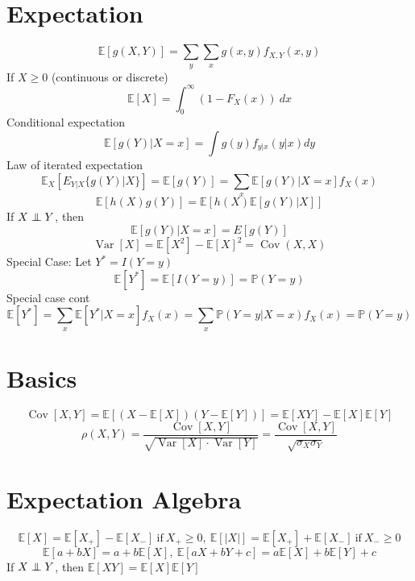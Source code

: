 \documentclass[twocolumn]{amsart}
\newcommand{\E}{\mathbb{E}}
\renewcommand{\P}{\mathbb{P}}
\newcommand{\Cov}{\operatorname{Cov}}
\newcommand{\Var}{\operatorname{Var}}
\newcommand\independent{\protect\mathpalette{\protect\independenT}{\perp}}
\def\independenT#1#2{\mathrel{\rlap{$#1#2$}\mkern3mu{#1#2}}}
\begin{document}
\pagestyle{empty}
\thispagestyle{empty}

\section*{Expectation}
\begin{equation*}
  \E[g(X,Y)] = \sum_{y}\sum_{x}g(x,y)f_{X,Y}(x,y)
\end{equation*}
If $X\geq 0$ (continuous or discrete)
\begin{equation*}
  \E[X] = \int_{0}^{\infty}(1-F_{X}(x))~dx
\end{equation*}
Conditional expectation
\begin{equation*}
  \E[g(Y)|X=x] = \int g(y) f_{y|x}(y|x)dy
\end{equation*}
Law of iterated expectation
\begin{equation*}
  \E_{X}[E_{Y|X}\{g(Y)|X\}] = \E[g(Y)] = \sum_{x}\E[g(Y)|X=x]f_{X}(x)
\end{equation*}
\begin{equation*}
  \E[h(X)g(Y)] = \E[h(X)\E[g(Y)|X]]
\end{equation*}
If \(X \independent Y\), then
\begin{equation*}
  \E[g(Y) | X=x] = E[g(Y)]
\end{equation*}
\begin{equation*}
  \Var[X] = \E[X^{2}] - \E[X]^{2} = \Cov(X,X)
\end{equation*}
Special Case: Let $Y^{*} = I(Y=y)$
\begin{equation*}
  \E[Y^{*}] = \E[I(Y=y)] = \P(Y=y)
\end{equation*}
Special case cont
\begin{equation*}
  \E[Y^{*}] = \sum_{x}\E[Y^{*}|X=x]f_{X}(x) = \sum_{x}\P(Y=y|X=x)f_{X}(x) =
  \P(Y=y)
\end{equation*}

\section*{Basics}
\begin{equation*}
  \Cov[X,Y] = \E[(X-\E[X])(Y-\E[Y])] = \E[XY] - \E[X]\E[Y]
\end{equation*}
\begin{equation*}
  \rho(X,Y) = \frac{\Cov[X,Y]}{\sqrt{\Var[X]\cdot\Var[Y]}} = \frac{\Cov[X,Y]}{\sqrt{\sigma_{X}\sigma_{Y}}}
\end{equation*}

\section*{Expectation Algebra}
\begin{equation*}
  \E[X]=\E[X_{+}] - \E[X_{-}]~\text{if}~X_{+} \geq 0,~\E[|X|] = \E[X_{+}] + \E[X_{-}]~\text{if}~X_{-} \geq 0
\end{equation*}
\begin{equation*}
  \E[a+bX] = a + b\E[X],~\E[aX+bY+c] = a\E[X]+b\E[Y]+c
\end{equation*}
If \(X \independent Y\), then $\E[XY] = \E[X]\E[Y]$
\end{document}
